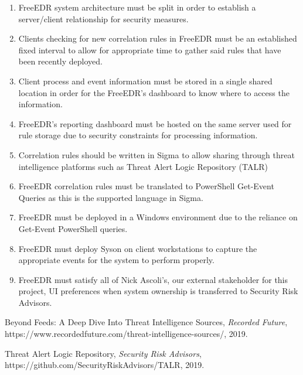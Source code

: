 \documentclass{scrreprt}
\begin{document}
\begin{enumerate}[label*=DR\arabic*.]
\item FreeEDR system architecture must be split in order to establish a server/client relationship for security measures.
\item Clients checking for new correlation rules in FreeEDR must be an established fixed interval to allow for appropriate time to gather said rules that have been recently deployed.
\item Client process and event information must be stored in a single shared location in order for the FreeEDR’s dashboard to know where to access the information.
\item FreeEDR’s reporting dashboard must be hosted on the same server used for rule storage due to security constraints for processing information.
\item Correlation rules should be written in Sigma to allow sharing through threat intelligence platforms such as Threat Alert Logic Repository (TALR)
\item FreeEDR correlation rules must be translated to PowerShell Get-Event Queries as this is the supported language in Sigma.
\item FreeEDR must be deployed in a Windows environment due to the reliance on Get-Event PowerShell queries.
\item FreeEDR must deploy Syson on client workstations to capture the appropriate events for the system to perform properly.
\item FreeEDR must satisfy all of Nick Ascoli’s, our external stakeholder for this project, UI preferences when system ownership is transferred to Security Risk Advisors.

\end{enumerate}

\begin{thebibliography}{9}

  Beyond Feeds: A Deep Dive Into Threat Intelligence Sources,
  \textit{Recorded Future},
  https://www.recordedfuture.com/threat-intelligence-sources/,
  2019.

  Threat Alert Logic Repository,
  \textit{Security Risk Advisors},
  https://github.com/SecurityRiskAdvisors/TALR,
  2019.

\end{thebibliography}
\end{document}
